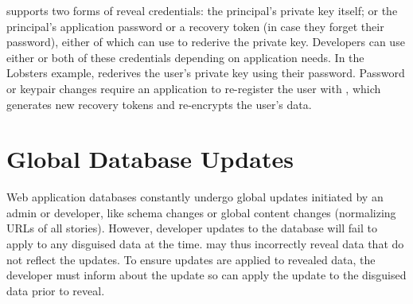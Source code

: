 %
\sys supports two forms of reveal credentials: \one{} the principal's private key
itself; or \two{} the principal's application password or a recovery
token (in case they forget their password), either of which \sys can use to rederive
the private key.
%
Developers can use either or both of these credentials depending on application needs.
%
In the Lobsters example, \sys rederives the user's private key using their password.
%
%
%
Password or keypair changes require an application to re-register the user with
\sys, which generates new recovery tokens and re-encrypts the user's \xxed data.
%
%
%
%

%
%

\section{Global Database Updates} 
\label{s:overview:updates}

Web application databases constantly undergo global updates 
initiated by an admin or developer, like schema changes or global content
changes (\eg normalizing URLs of all stories). 
%
However, developer updates to the database will fail to apply to any disguised
data at the time. \sys may thus incorrectly reveal data that do not
reflect the updates. 
%
To ensure updates are applied to revealed data, the developer must inform \sys
about the update so \sys can apply the update to the disguised data prior to
reveal.

